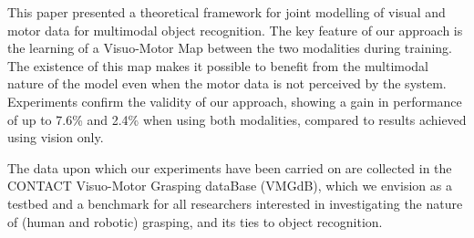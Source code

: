 This paper presented a theoretical framework for joint modelling of visual and motor data for multimodal object recognition.
The key feature of our approach is the learning of a Visuo-Motor Map between the two modalities during training.
The existence of this map makes it possible to benefit from the multimodal nature of the model even when the motor data
is not perceived by the system. Experiments confirm the validity of our approach, showing a gain in performance
of up to 7.6\% and 2.4\% when using both modalities, compared to results achieved using vision only.


The data upon which our experiments have been carried on are collected in the
CONTACT Visuo-Motor Grasping dataBase (VMGdB), which we envision as a testbed and
a benchmark for all researchers interested in investigating the nature of (human and
robotic) grasping, and its ties to object recognition. %

